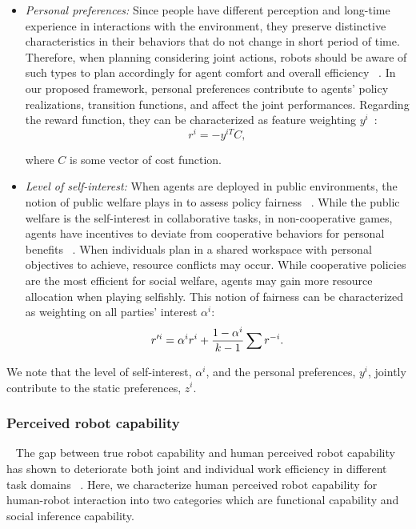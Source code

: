 \documentclass[letterpaper, 10 pt, conference]{ieeeconf}  %
\begin{document}
\begin{itemize}
	\item \textit{Personal preferences:} Since people have different perception and long-time experience in interactions with the environment, they preserve distinctive characteristics in their behaviors that do not change in short period of time. Therefore, when planning considering joint actions, robots should be aware of such types to plan accordingly for agent comfort and overall efficiency ~\cite{gombolay2015coordination}. In our proposed framework, personal preferences contribute to agents' policy realizations, transition functions, and affect the joint performances. Regarding the reward function, they can be characterized as feature weighting $y^i$~\cite{dorsa2017active}:
	\begin{equation}
	r^i = -y^{iT}C, 
	\end{equation}
	
	where $C$ is some vector of cost function.
	\item \textit{Level of self-interest:} When agents are deployed in public environments, the notion of public welfare plays in to assess policy fairness ~\cite{fehr2004social}. While the public welfare is the self-interest in collaborative tasks, in non-cooperative games, agents have incentives to deviate from cooperative behaviors for personal benefits ~\cite{fujiwara2015non}. When individuals plan in a shared workspace with personal objectives to achieve, resource conflicts may occur. 
	While cooperative policies are the most efficient for social welfare, agents may gain more resource allocation when playing selfishly. This notion of fairness can be characterized as weighting on all parties' interest $\alpha^i$:
	\begin{equation}
	r'^{i} = \alpha^ir^i+ \small{\frac{1-\alpha^i}{k-1}}\sum r^{-i}.
	\end{equation}
	
\end{itemize}

We note that the level of self-interest, $\alpha^i$, and the personal preferences, $y^i$, jointly contribute to the static preferences, $z^i$.

\subsubsection{Perceived robot capability}~\label{sec:perceived}
The gap between true robot capability and human perceived robot capability has shown to deteriorate both joint and individual work efficiency in different task domains ~\cite{dragan2015effects}. Here, we characterize human perceived robot capability for human-robot interaction into two categories which are functional capability and social inference capability.
\end{document}
